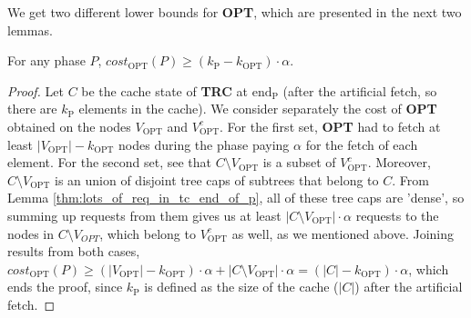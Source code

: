 We get two different lower bounds for \textbf{OPT}, which are presented in the
next two lemmas.
\begin{lemma}
For any phase $P$, $cost_{\mathrm{OPT}}(P) \geq
(k_{\mathrm{P}} - k_{\mathrm{OPT}}) \cdot \alpha$.
\label{thm:opt_bound_with_k}
\end{lemma}
\begin{proof}
Let $C$ be the cache state of \textbf{TRC} at
$\mathrm{end_P}$ (after the artificial fetch, so there are $k_{\mathrm{P}}$ elements in the
cache). We consider separately the cost of \textbf{OPT} obtained on the nodes
$V_{\mathrm{OPT}}$ and $V_{\mathrm{OPT}}^c$. For the first set, \textbf{OPT} had
to fetch at least $|V_{\mathrm{OPT}}| - k_{\mathrm{OPT}}$ nodes during the phase
paying $\alpha$ for the fetch of each element. For the second set, see that $C \setminus
V_{\mathrm{OPT}}$ is a subset of $V_{\mathrm{OPT}}^c$. Moreover, $C \setminus
V_{\mathrm{OPT}}$ is an union of disjoint tree caps of subtrees that belong to
$C$. From Lemma \ref{thm:lots_of_req_in_tc_end_of_p}, all of these tree caps are
'dense', so summing up requests from them gives us at least $|C \setminus
V_{\mathrm{OPT}}| \cdot \alpha$ requests to the nodes in $C \setminus V_{OPT}$,
which belong to $V_{\mathrm{OPT}}^c$ as well, as we mentioned above. Joining
results from both cases, $cost_{\mathrm{OPT}}(P) \geq (|V_{\mathrm{OPT}}| -
k_{\mathrm{OPT}}) \cdot \alpha + |C \setminus V_{\mathrm{OPT}}| \cdot \alpha =
(|C| - k_{\mathrm{OPT}}) \cdot \alpha$, which ends the proof, since $k_{\mathrm{P}}$ is
defined as the size of the cache ($|C|$) after the artificial fetch.
\end{proof}

